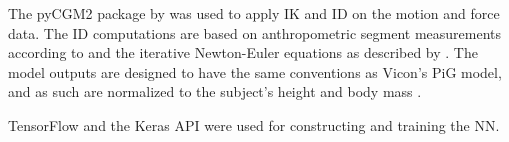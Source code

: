 \documentclass[../main.tex]{subfiles}
\begin{document}
The pyCGM2 package by \textcite{Leboeuf2019} was used to apply \ac{IK} and \ac{ID} on the motion and force data.
The \ac{ID} computations are based on anthropometric segment measurements according to \textcite{Dempster1955} and the iterative Newton-Euler equations as described by \textcite{Dumas2004}.
The model outputs are designed to have the same conventions as Vicon's \ac{PiG} model, and as such are normalized to the subject's height and body mass .

TensorFlow \cite{tensorflow2015-whitepaper} and the Keras API \cite{chollet2015keras} were used for constructing and training the \ac{NN}.




\end{document}
